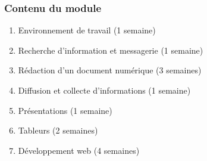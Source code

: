 \documentclass{beamer}
\begin{document}
\begin{frame}
\frametitle{Contenu du module}

\begin{enumerate}
	\item Environnement de travail (1 semaine)
	\item Recherche d'information et messagerie (1 semaine)
	\item Rédaction d'un document numérique (3 semaines)
	\item Diffusion et collecte d'informations (1 semaine)
	\item Présentations (1 semaine)
	\item Tableurs (2 semaines) 
	\item Développement web (4 semaines)
\end{enumerate}

\end{frame}
\end{document}
